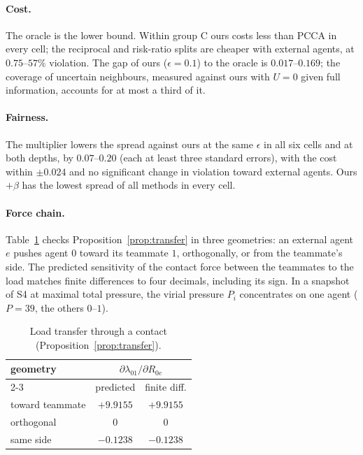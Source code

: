\documentclass[11pt]{article}
\theoremstyle{definition}
\theoremstyle{remark}
\begin{document}
\paragraph{Cost.} The oracle is the lower bound. Within group C ours costs less than PCCA in every cell; the reciprocal and risk-ratio splits are cheaper with external agents, at $0.75$--$57\%$ violation. The gap of ours ($\epsilon=0.1$) to the oracle is $0.017$--$0.169$; the coverage of uncertain neighbours, measured against ours with $U=0$ given full information, accounts for at most a third of it.

\paragraph{Fairness.} The multiplier lowers the spread against ours at the same $\epsilon$ in all six cells and at both depths, by $0.07$--$0.20$ (each at least three standard errors), with the cost within $\pm0.024$ and no significant change in violation toward external agents. Ours$+\beta$ has the lowest spread of all methods in every cell.

\paragraph{Force chain.} Table~\ref{tab:transfer} checks Proposition~\ref{prop:transfer} in three geometries: an external agent $e$ pushes agent $0$ toward its teammate $1$, orthogonally, or from the teammate's side. The predicted sensitivity of the contact force between the teammates to the load matches finite differences to four decimals, including its sign. In a snapshot of S4 at maximal total pressure, the virial pressure $P_i$ concentrates on one agent ($P=39$, the others $0$--$1$).

\begin{table}[h]
\centering\small
\begin{tabular}{lcc}
\toprule
geometry & \multicolumn{2}{c}{$\partial\lambda_{01}/\partial R_{0e}$}\\
\cmidrule(lr){2-3}
 & predicted & finite diff.\\
\midrule
toward teammate & $+9.9155$ & $+9.9155$\\
orthogonal & 0 & 0\\
same side & $-0.1238$ & $-0.1238$\\
\bottomrule
\end{tabular}
\caption{Load transfer through a contact (Proposition~\ref{prop:transfer}).}
\label{tab:transfer}
\end{table}
\end{document}

